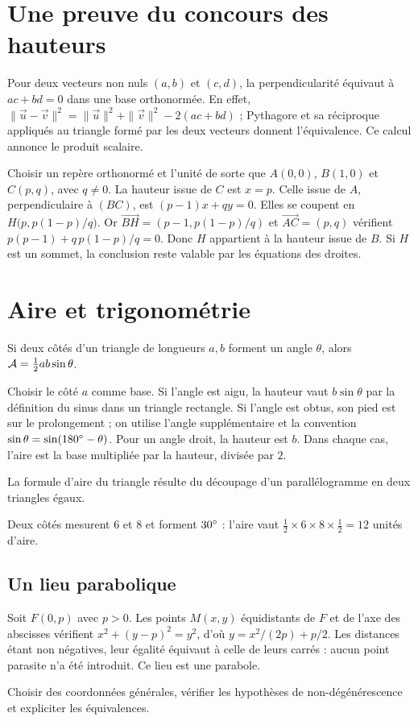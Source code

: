 \documentclass[../cours_2de.tex]{subfiles}
\begin{document}
\section{Une preuve du concours des hauteurs}
\approfondissement Pour deux vecteurs non nuls $(a,b)$ et $(c,d)$, la perpendicularité équivaut à $ac+bd=0$ dans une base orthonormée.
En effet,
$\|\vec u-\vec v\|^2=\|\vec u\|^2+\|\vec v\|^2-2(ac+bd)$ ;
Pythagore et sa réciproque appliqués au triangle formé par les deux vecteurs donnent l'équivalence.
Ce calcul annonce le produit scalaire.
\begin{demonstration}
Choisir un repère orthonormé et l'unité de sorte que $A(0,0)$, $B(1,0)$ et $C(p,q)$, avec $q\ne0$.
La hauteur issue de $C$ est $x=p$. Celle issue de $A$, perpendiculaire à $(BC)$, est
$(p-1)x+qy=0$.
Elles se coupent en $H\bigl(p,p(1-p)/q\bigr)$.
Or $\overrightarrow{BH}=(p-1,p(1-p)/q)$ et $\overrightarrow{AC}=(p,q)$ vérifient
$p(p-1)+q\,p(1-p)/q=0$.
Donc $H$ appartient à la hauteur issue de $B$. Si $H$ est un sommet, la conclusion reste valable par les équations des droites.
\end{demonstration}
\section{Aire et trigonométrie}
\approfondissement Si deux côtés d'un triangle de longueurs $a,b$ forment un angle $\theta$, alors
$\mathcal{A}=\tfrac12 ab\sin\theta$.
\begin{demonstration}
Choisir le côté $a$ comme base. Si l'angle est aigu, la hauteur vaut $b\sin\theta$ par la définition du sinus dans un triangle rectangle.
Si l'angle est obtus, son pied est sur le prolongement ; on utilise l'angle supplémentaire et la convention
$\sin\theta=\sin(180^{\circ}-\theta)$.
Pour un angle droit, la hauteur est $b$. Dans chaque cas, l'aire est la base multipliée par la hauteur, divisée par $2$.
\end{demonstration}
La formule d'aire du triangle résulte du découpage d'un parallélogramme en deux triangles égaux.
\begin{exemple}
Deux côtés mesurent $6$ et $8$ et forment $30^{\circ}$ : l'aire vaut
$\frac12\times6\times8\times\frac12=12$ unités d'aire.
\end{exemple}
\begin{finchapitre}
\section{Un lieu parabolique}
\approfondissement Soit $F(0,p)$ avec $p>0$. Les points $M(x,y)$ équidistants de $F$ et de l'axe des abscisses vérifient
$x^2+(y-p)^2=y^2$, d'où
$y=x^2/(2p)+p/2$.
Les distances étant non négatives, leur égalité équivaut à celle de leurs carrés : aucun point parasite n'a été introduit. Ce lieu est une parabole.
\begin{retenir}
Choisir des coordonnées générales, vérifier les hypothèses de non-dégénérescence et expliciter les équivalences.
\end{retenir}
\end{finchapitre}
\end{document}
